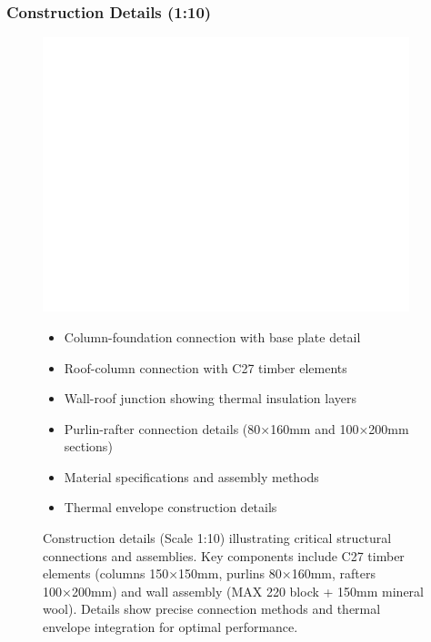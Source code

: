 \documentclass[12pt,a4paper]{article}
\begin{document}
\subsubsection{Construction Details (1:10)}
\begin{figure}[H]
    \centering
    \includegraphics[width=0.95\textwidth]{cad_project/exports/screenshots/detail_drawings.png}
    \caption{Construction details (Scale 1:10) illustrating critical structural connections and assemblies.
    Key components include C27 timber elements (columns 150×150mm, purlins 80×160mm, rafters 100×200mm) and wall assembly (MAX 220 block + 150mm mineral wool).
    Details show precise connection methods and thermal envelope integration for optimal performance.}

\begin{itemize}
    \item Column-foundation connection with base plate detail
    \item Roof-column connection with C27 timber elements
    \item Wall-roof junction showing thermal insulation layers
    \item Purlin-rafter connection details (80×160mm and 100×200mm sections)
    \item Material specifications and assembly methods
    \item Thermal envelope construction details
\end{itemize}
    \label{fig:details}
\end{figure}
\end{document}
